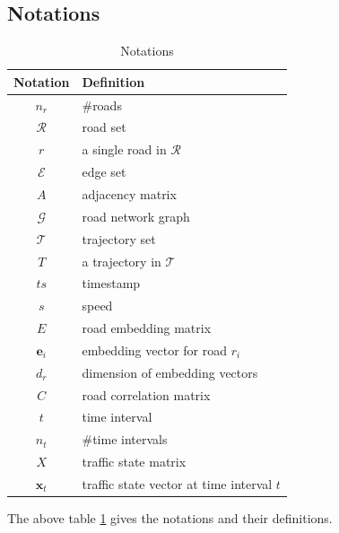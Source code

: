 \subsection{Notations}
\begin{table}[htb]
    \begin{center}
        \caption{Notations}
        \label{notation_table}
        \begin{tabular}{cl}
            \toprule

            \textbf{Notation} & \textbf{Definition}                       \\

            \midrule

            $n_r$             & \#roads                                   \\
            $\mathcal R$      & road set                                  \\
            $r$               & a single road in $\mathcal R$             \\
            $\mathcal E$      & edge set                                  \\
            $A$               & adjacency matrix                          \\
            $\mathcal G$      & road network graph                        \\
            $\mathcal T$      & trajectory set                            \\
            $T$               & a trajectory in $\mathcal T$              \\
            $ts$              & timestamp                                 \\
            $s$               & speed                                     \\
            $E$               & road embedding matrix                     \\
            $\mathbf{e}_i$    & embedding vector for road $r_i$           \\
            $d_r$             & dimension of embedding vectors            \\
            $C$               & road correlation matrix                   \\
            $t$               & time interval                             \\
            $n_t$             & \#time intervals                          \\
            $X$               & traffic state matrix                      \\
            $\mathbf x_t$     & traffic state vector at time interval $t$ \\

            \bottomrule
        \end{tabular}
    \end{center}
\end{table}
The above table \ref{notation_table} gives the notations and their definitions.

